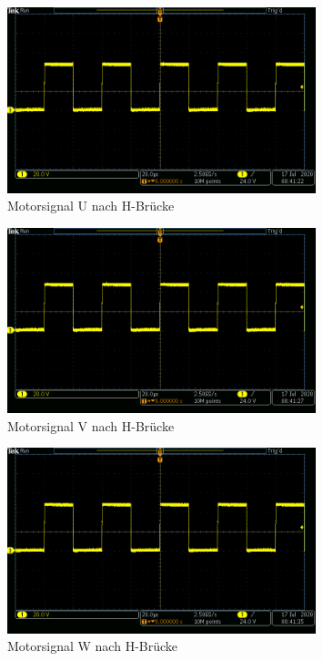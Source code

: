 \begin{appendix}
\newpage


\begin{figure}[h!]
\center
\includegraphics[width = 0.8\textwidth]{graphics/Motor_U}
\caption{Motorsignal U nach H-Brücke}
\label{fig:Motor_U}
\end{figure}

\begin{figure}[h!]
\center
\includegraphics[width = 0.8\textwidth]{graphics/Motor_V}
\caption{Motorsignal V nach H-Brücke}
\label{fig:Motor_V}
\end{figure}

\newpage


\begin{figure}[h!]
\center
\includegraphics[width = 0.8\textwidth]{graphics/Motor_W}
\caption{Motorsignal W nach H-Brücke}
\label{fig:Motor_W}
\end{figure}



\end{appendix}
